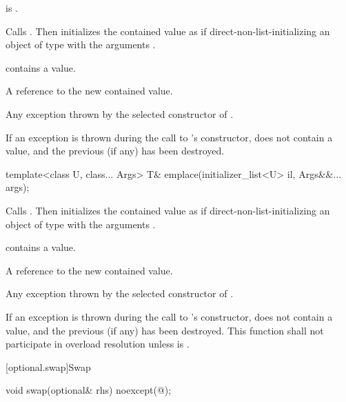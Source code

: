 \begin{itemdescr}
\pnum
\requires
{} is .

\pnum
\effects
Calls . Then initializes the contained value as if direct-non-list-initializing an object of type  with the arguments .

\pnum
\ensures
{} contains a value.

\pnum
\returns
A reference to the new contained value.

\pnum
\throws
Any exception thrown by the selected constructor of .

\pnum
\remarks
If an exception is thrown during the call to 's constructor,  does not contain a value, and the previous  (if any) has been destroyed.
\end{itemdescr}

%
\begin{itemdecl}
template<class U, class... Args> T& emplace(initializer_list<U> il, Args&&... args);
\end{itemdecl}

\begin{itemdescr}
\pnum
\effects
Calls . Then initializes the contained value as if direct-non-list-initializing an object of type  with the arguments .

\pnum
\ensures
{} contains a value.

\pnum
\returns
A reference to the new contained value.

\pnum
\throws
Any exception thrown by the selected constructor of .

\pnum
\remarks
If an exception is thrown during the call to 's constructor,  does not contain a value, and the previous  (if any) has been destroyed.
This function shall not participate in overload resolution unless  is .
\end{itemdescr}

[optional.swap]{Swap}

%
\begin{itemdecl}
void swap(optional& rhs) noexcept(@\seebelow@);
\end{itemdecl}

